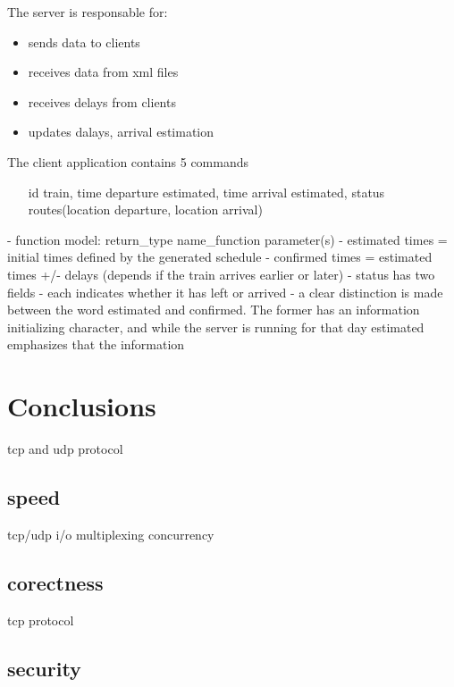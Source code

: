 \documentclass[runningheads]{llncs}
\begin{document}
The server is responsable for:
\begin{itemize}
    \item sends data to clients
    \item receives data from xml files
    \item receives delays from clients
    \item updates dalays, arrival estimation

\end{itemize}
    
The client application contains 5 commands

\begin{itemize}
    \item [id train, time departure estimated, time arrival estimated, status] routes(location departure, location arrival)
\end{itemize}


- function model: return_type name_function parameter(s)
- estimated times = initial times defined by the generated schedule
- confirmed times = estimated times +/- delays (depends if the train arrives earlier or later)
- status has two fields - each indicates whether it has left or arrived
- a clear distinction is made between the word estimated and confirmed. The former has an information initializing character, and while the server is running for that day estimated emphasizes that the information


\section{Conclusions}

tcp and udp protocol


\subsection{speed}

tcp/udp
i/o multiplexing
concurrency

\subsection{corectness}

tcp protocol

\subsection{security}
\end{document}
